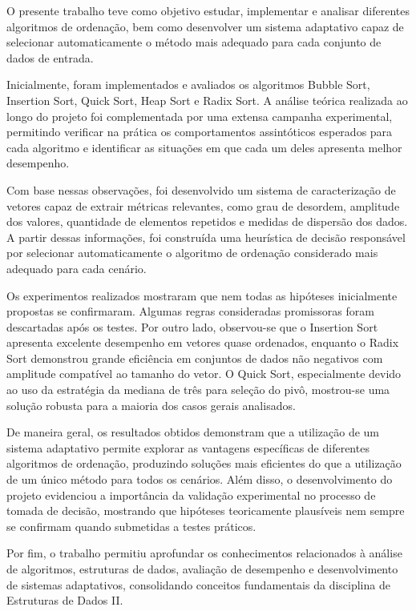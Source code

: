 \documentclass{article}
\begin{document}
O presente trabalho teve como objetivo estudar, implementar e analisar diferentes algoritmos de ordenação, bem como desenvolver um sistema adaptativo capaz de selecionar automaticamente o método mais adequado para cada conjunto de dados de entrada.

Inicialmente, foram implementados e avaliados os algoritmos Bubble Sort, Insertion Sort, Quick Sort, Heap Sort e Radix Sort. A análise teórica realizada ao longo do projeto foi complementada por uma extensa campanha experimental, permitindo verificar na prática os comportamentos assintóticos esperados para cada algoritmo e identificar as situações em que cada um deles apresenta melhor desempenho.

Com base nessas observações, foi desenvolvido um sistema de caracterização de vetores capaz de extrair métricas relevantes, como grau de desordem, amplitude dos valores, quantidade de elementos repetidos e medidas de dispersão dos dados. A partir dessas informações, foi construída uma heurística de decisão responsável por selecionar automaticamente o algoritmo de ordenação considerado mais adequado para cada cenário.

Os experimentos realizados mostraram que nem todas as hipóteses inicialmente propostas se confirmaram. Algumas regras consideradas promissoras foram descartadas após os testes. Por outro lado, observou-se que o Insertion Sort apresenta excelente desempenho em vetores quase ordenados, enquanto o Radix Sort demonstrou grande eficiência em conjuntos de dados não negativos com amplitude compatível ao tamanho do vetor. O Quick Sort, especialmente devido ao uso da estratégia da mediana de três para seleção do pivô, mostrou-se uma solução robusta para a maioria dos casos gerais analisados.

De maneira geral, os resultados obtidos demonstram que a utilização de um sistema adaptativo permite explorar as vantagens específicas de diferentes algoritmos de ordenação, produzindo soluções mais eficientes do que a utilização de um único método para todos os cenários. Além disso, o desenvolvimento do projeto evidenciou a importância da validação experimental no processo de tomada de decisão, mostrando que hipóteses teoricamente plausíveis nem sempre se confirmam quando submetidas a testes práticos.

Por fim, o trabalho permitiu aprofundar os conhecimentos relacionados à análise de algoritmos, estruturas de dados, avaliação de desempenho e desenvolvimento de sistemas adaptativos, consolidando conceitos fundamentais da disciplina de Estruturas de Dados II.
\end{document}
